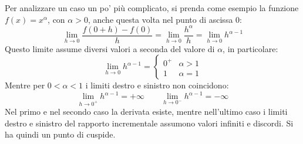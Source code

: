 \begin{examp}
	Per analizzare un caso un po' più complicato, si prenda come esempio la funzione $f(x)=x^\alpha$, con $\alpha>0$, anche questa volta nel punto di ascissa $0$:
	\[
		\lim_{h\to0} \frac{f(0+h)-f(0)}{h} = \lim_{h\to0} \frac{h^\alpha}{h}=\lim_{h\to0} h^{\alpha-1}
	\]
	Questo limite assume diversi valori a seconda del valore di $\alpha$, in particolare:
	\[
		\lim_{h\to0} h^{\alpha-1}=
		\begin{cases}
			0^+ & \alpha>1 \\
			1   & \alpha=1
		\end{cases}
	\]
	Mentre per $0<\alpha<1$ i limiti destro e sinistro non coincidono:
	\[
		\lim_{h\to0^+} h^{\alpha-1}=+\infty\qquad\lim_{h\to0^-} h^{\alpha-1}=-\infty
	\]
	Nel primo e nel secondo caso la derivata esiste, mentre nell'ultimo caso i limiti destro e sinistro del rapporto incrementale assumono valori infiniti e discordi. Si ha quindi un punto di cuspide.
\end{examp}
